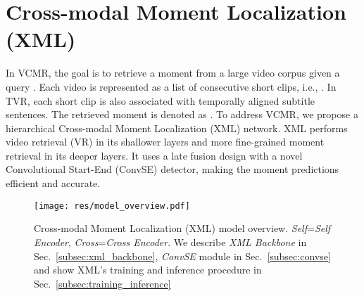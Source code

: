 \documentclass[runningheads]{llncs}
\begin{document}
 \section{Cross-modal Moment Localization (XML)}\label{sec:methods}

In VCMR, the goal is to retrieve a moment from a large video corpus  given a query . 
Each video  is represented as a list of consecutive short clips, i.e., . In TVR, each short clip is also associated with temporally aligned subtitle sentences.
The retrieved moment is denoted as .
To address VCMR, we propose a hierarchical Cross-modal Moment Localization (XML) network. 
XML performs video retrieval (VR) in its shallower layers and more fine-grained moment retrieval in its deeper layers.
It uses a late fusion design with a novel Convolutional Start-End (ConvSE) detector, making the moment predictions efficient and accurate.


\begin{figure*}[!t]
  \centering
  \texttt{[image: res/model\_overview.pdf]}
  \caption{Cross-modal Moment Localization (XML) model overview. \textit{Self}=\textit{Self Encoder}, \textit{Cross}=\textit{Cross Encoder}.  We describe \textit{XML Backbone} in Sec.~\ref{subsec:xml_backbone}, \textit{ConvSE} module in Sec.~\ref{subsec:convse} and show XML's training and inference procedure in Sec.~\ref{subsec:training_inference}}
  \label{fig:model_overview}
\end{figure*}
\end{document}
